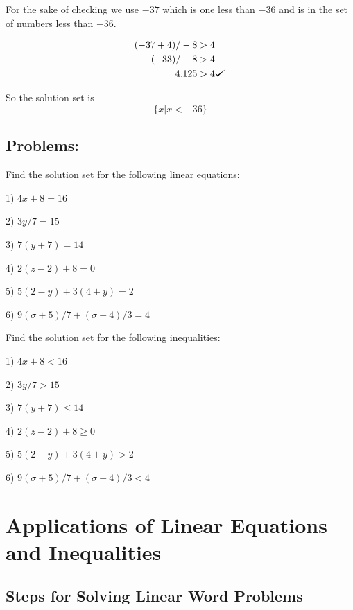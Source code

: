 \documentclass{book}
\theoremstyle{definition}
\def\checkmark{\tikz\fill[scale=0.4](0,.35) -- (.25,0) -- (1,.7) -- (.25,.15) -- cycle;}
\begin{document}
For the sake of checking we use $-37$ which is one less than $-36$ and is in the set of numbers less than $-36$.

\begin{equation}
\label{(4.11)}
\begin{split}
(-37+4)/-8  &>  4 \\
  (-33)/-8  &>  4 \\
  4.125     &>  4 \checkmark{}
\end{split}
\end{equation}

So the solution set is
\begin{equation}
\label{(4.12)}
\{x|x<-36\}
\end{equation}
                        
        
\subsection{Problems:}

Find the solution set for the following linear equations:

\vspace{3mm}

1) $4x+8=16$

2) $3y/7=15$

3) $7(y+7)=14$

4) $2(z-2)+8=0$

5) $5(2-y)+3(4+y)=2$

6) $9(\sigma+5)/7+(\sigma-4)/3=4$

\vspace{5mm}
Find the solution set for the following inequalities:
\vspace{3mm}

1) $4x+8<16$

2) $3y/7>15$

3) $7(y+7)\leq14$

4) $2(z-2)+8\geq0$

5) $5(2-y)+3(4+y)>2$

6) $9(\sigma+5)/7+(\sigma-4)/3<4$

\newpage

\section{Applications of Linear Equations and Inequalities}

\subsection{Steps for Solving Linear Word Problems}
\end{document}

